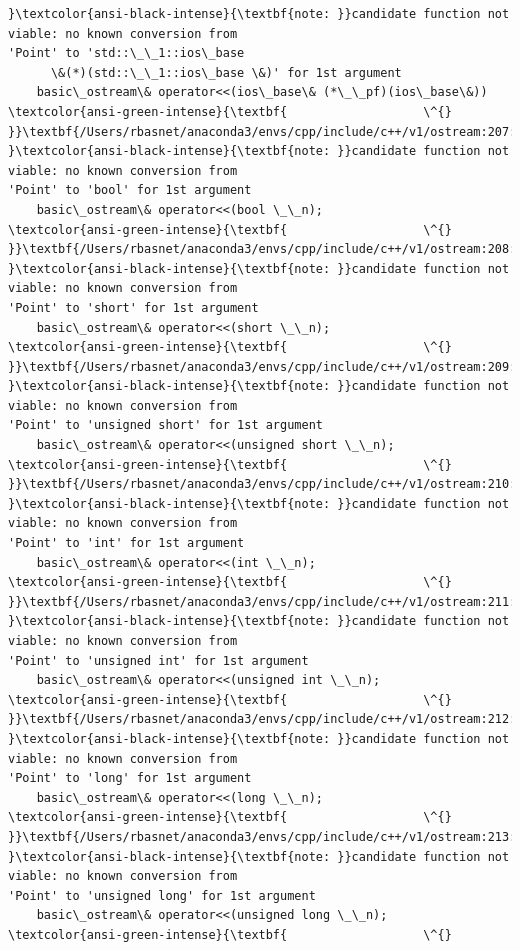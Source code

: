 \documentclass[11pt]{article}
\begin{document}
\begin{Verbatim}[commandchars=\\\{\}]
}\textcolor{ansi-black-intense}{\textbf{note: }}candidate function not viable: no known conversion from
'Point' to 'std::\_\_1::ios\_base
      \&(*)(std::\_\_1::ios\_base \&)' for 1st argument
    basic\_ostream\& operator<<(ios\_base\& (*\_\_pf)(ios\_base\&))
\textcolor{ansi-green-intense}{\textbf{                   \^{}
}}\textbf{/Users/rbasnet/anaconda3/envs/cpp/include/c++/v1/ostream:207:20:
}\textcolor{ansi-black-intense}{\textbf{note: }}candidate function not viable: no known conversion from
'Point' to 'bool' for 1st argument
    basic\_ostream\& operator<<(bool \_\_n);
\textcolor{ansi-green-intense}{\textbf{                   \^{}
}}\textbf{/Users/rbasnet/anaconda3/envs/cpp/include/c++/v1/ostream:208:20:
}\textcolor{ansi-black-intense}{\textbf{note: }}candidate function not viable: no known conversion from
'Point' to 'short' for 1st argument
    basic\_ostream\& operator<<(short \_\_n);
\textcolor{ansi-green-intense}{\textbf{                   \^{}
}}\textbf{/Users/rbasnet/anaconda3/envs/cpp/include/c++/v1/ostream:209:20:
}\textcolor{ansi-black-intense}{\textbf{note: }}candidate function not viable: no known conversion from
'Point' to 'unsigned short' for 1st argument
    basic\_ostream\& operator<<(unsigned short \_\_n);
\textcolor{ansi-green-intense}{\textbf{                   \^{}
}}\textbf{/Users/rbasnet/anaconda3/envs/cpp/include/c++/v1/ostream:210:20:
}\textcolor{ansi-black-intense}{\textbf{note: }}candidate function not viable: no known conversion from
'Point' to 'int' for 1st argument
    basic\_ostream\& operator<<(int \_\_n);
\textcolor{ansi-green-intense}{\textbf{                   \^{}
}}\textbf{/Users/rbasnet/anaconda3/envs/cpp/include/c++/v1/ostream:211:20:
}\textcolor{ansi-black-intense}{\textbf{note: }}candidate function not viable: no known conversion from
'Point' to 'unsigned int' for 1st argument
    basic\_ostream\& operator<<(unsigned int \_\_n);
\textcolor{ansi-green-intense}{\textbf{                   \^{}
}}\textbf{/Users/rbasnet/anaconda3/envs/cpp/include/c++/v1/ostream:212:20:
}\textcolor{ansi-black-intense}{\textbf{note: }}candidate function not viable: no known conversion from
'Point' to 'long' for 1st argument
    basic\_ostream\& operator<<(long \_\_n);
\textcolor{ansi-green-intense}{\textbf{                   \^{}
}}\textbf{/Users/rbasnet/anaconda3/envs/cpp/include/c++/v1/ostream:213:20:
}\textcolor{ansi-black-intense}{\textbf{note: }}candidate function not viable: no known conversion from
'Point' to 'unsigned long' for 1st argument
    basic\_ostream\& operator<<(unsigned long \_\_n);
\textcolor{ansi-green-intense}{\textbf{                   \^{}

\end{Verbatim}
\end{document}
